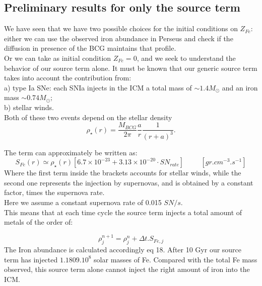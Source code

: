\documentclass{article}
\begin{document}
\newpage
\subsection{Preliminary results for only the source term}
We have seen that we have two possible choices for the initial conditions on \(Z_{Fe}:\) either we can use the observed iron abundance in Perseus and check if the diffusion in presence of the BCG maintains that profile.  \\
Or we can take as initial condition $Z_{Fe} = 0$, and we seek to understand the behavior of our source term alone.
It must be known that our generic source term takes into account the contribution from:\\
a) type Ia SNe: each SNIa injects in the ICM a total mass of \(\sim 1.4 M_{\odot}\) and an iron mass \(\sim 0.74 M_{\odot};\)\\
b) stellar winds.\\
Both of these two events depend on the stellar density
\begin{equation*}
   \rho_{\star}(r)=\frac{M_{BCG}}{2\pi}\frac{a}{r}\frac{1}{(r+a)^{3}}. 
\end{equation*}
 
The term can approximately be written as: 
\begin{equation}
S_{Fe}(r)\simeq \rho_{\star}(r)[6.7\times 10^{-23}+3.13\times 10^{-20} \cdot SN_{rate}] \hspace{1cm} [gr.cm^{-3}.s^{-1}]
\end{equation}
Where the first term inside the brackets accounts for stellar winds, while the second one represents the injection by supernovas, and is obtained by a constant factor, times the supernova rate. \\ Here we assume a constant supernova rate of 0.015 $SN/s$.\\
This means that at each time cycle the source term injects a total amount of metals of the order of:

\begin{equation*}
    \rho^{n+1}_j = \rho^{n}_j + \Delta t . S_{Fe,j}
\end{equation*}
The Iron abundance is calculated accordingly eq 18. After 10 Gyr our source term has injected $1.1809.10^{8}$ solar masses of Fe. Compared with the total Fe mass observed, this source term alone cannot inject the right amount of iron into the ICM.
\end{document}

